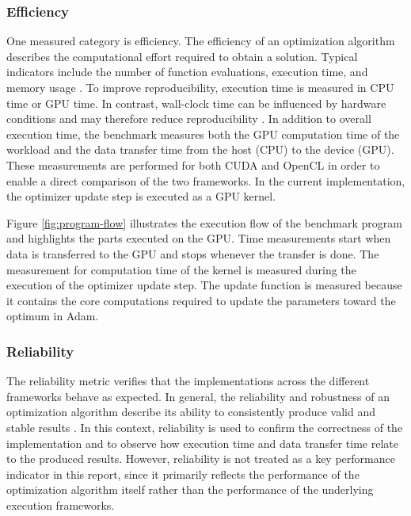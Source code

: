 \subsubsection{Efficiency}

One measured category is efficiency. The efficiency of an optimization
algorithm describes the computational effort required to obtain a solution.
Typical indicators include the number of function evaluations, execution
time, and memory usage \cite{best-practices-benchmark}.
To improve reproducibility, execution time is measured in CPU time or GPU
time. In contrast, wall-clock time can be influenced by hardware conditions
and may therefore reduce reproducibility \cite{best-practices-benchmark}.
In addition to overall execution time, the benchmark measures both the GPU
computation time of the workload and the data transfer time from the host
(CPU) to the device (GPU). These measurements are performed for both CUDA
and OpenCL in order to enable a direct comparison of the two frameworks.
In the current implementation, the optimizer update step is executed as a
GPU kernel.

Figure \ref{fig:program-flow} illustrates the execution flow of the benchmark
program and highlights the parts executed on the GPU. Time measurements start
when data is transferred to the GPU and stops whenever the transfer is done. 
The measurement for computation time of the kernel is measured during the execution of the
optimizer update step.
The update function is measured because it contains the core computations
required to update the parameters toward the optimum in Adam.


\subsubsection{Reliability}

The reliability metric verifies that the implementations across the different
frameworks behave as expected. In general, the reliability and robustness of an
optimization algorithm describe its ability to consistently produce valid and
stable results \cite{best-practices-benchmark}.
In this context, reliability is used to confirm the correctness of the
implementation and to observe how execution time and data transfer time
relate to the produced results. However, reliability is not treated as a
key performance indicator in this report, since it primarily reflects the
performance of the optimization algorithm itself rather than the performance
of the underlying execution frameworks.

